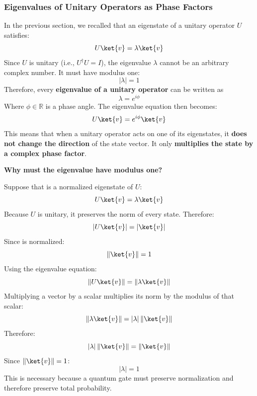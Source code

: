 \subsubsection{Eigenvalues of Unitary Operators as Phase Factors}\label{ex:eigenvalues-of-unitary-operators-as-phase-factors}

In the previous section, we recalled that an eigenstate  of a unitary operator $U$ satisfies:
\begin{equation*}
    U\ket{v}=\lambda\ket{v}
\end{equation*}
Since $U$ is unitary (i.e., $U^\dagger U=I$), the eigenvalue $\lambda$ cannot be an arbitrary complex number. It must have modulus one:
\begin{equation*}
    \left|\lambda\right|=1
\end{equation*}
Therefore, every \textbf{eigenvalue of a unitary operator} can be written as
\begin{equation*}
    \lambda=e^{i\phi}
\end{equation*}
Where $\phi\in\mathbb{R}$ is a phase angle. The eigenvalue equation then becomes:
\begin{equation*}
    U\ket{v}=e^{i\phi}\ket{v}
\end{equation*}
This means that when a unitary operator acts on one of its eigenstates, it \textbf{does not change the direction} of the state vector. It only \textbf{multiplies the state by a complex phase factor}.

\highspace
\begin{flushleft}
    \textcolor{Green3}{ \textbf{Why must the eigenvalue have modulus one?}}
\end{flushleft}
Suppose that  is a normalized eigenstate of $U$:
\begin{equation*}
    U\ket{v}=\lambda\ket{v}
\end{equation*}
Because $U$ is unitary, it preserves the norm of every state. Therefore:
\begin{equation*}
    \left|U\ket{v}\right|=\left|\ket{v}\right|
\end{equation*}
Since  is normalized:
\begin{equation*}
    \left\|\ket{v}\right\| = 1
\end{equation*}
Using the eigenvalue equation:
\begin{equation*}
    \left\|U\ket{v}\right\| = \left\|\lambda\ket{v}\right\|
\end{equation*}
Multiplying a vector by a scalar multiplies its norm by the modulus of that scalar:
\begin{equation*}
    \left\|\lambda\ket{v}\right\| = \left|\lambda\right|\left\|\ket{v}\right\|
\end{equation*}
Therefore:
\begin{equation*}
    \left|\lambda\right| \left\|\ket{v}\right\| = \left\|\ket{v}\right\|
\end{equation*}
Since $\left\|\ket{v}\right\|=1$:
\begin{equation*}
    \left|\lambda\right| = 1
\end{equation*}
This is necessary because a quantum gate must preserve normalization and therefore preserve total probability.

